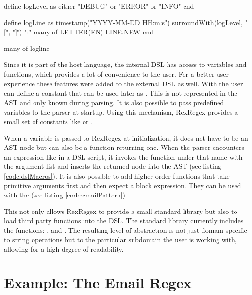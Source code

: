 \begin{rexregexBox}[float=htb,label=code:dslMacros,title=Usage of Macros in RexRegex,width=12cm,center]
define logLevel as
    either "DEBUG" or "ERROR" or "INFO"
end

define logLine as
    timestamp("YYYY-MM-DD HH:m:s")
    surroundWith(logLevel, "[", "]")
    ":"
    many of LETTER(EN)
    LINE.NEW
end

many of logline
\end{rexregexBox}

Since it is part of the host language, the internal DSL has access to variables and functions, which provides a lot of convenience to the user. For a better user experience these features were added to the external DSL as well. With  the user can define a constant that can be used later as . This is not represented in the AST and only known during parsing. It is also possible to pass predefined variables  to the parser at startup. Using this mechanism, RexRegex provides a small set of constants like  or . 

When a variable is passed to RexRegex at initialization, it does not have to be an AST node but can also be a function returning one. When the parser encounters an expression like  in a DSL script, it invokes the function under that name with the argument list and inserts the returned node into the AST (see listing \ref{code:dslMacros}). It is also possible to add higher order functions  that take primitive arguments first and then expect a block expression. They can be used with the  (see listing \ref{code:emailPattern}).

This not only allows RexRegex to provide a small standard library but also to load third party functions into the DSL. The standard library currently includes the functions: ,  and . The resulting level of abstraction is not just domain specific to string operations but to the particular subdomain the user is working with, allowing for a high degree of readability.

\section{Example: The Email Regex}

